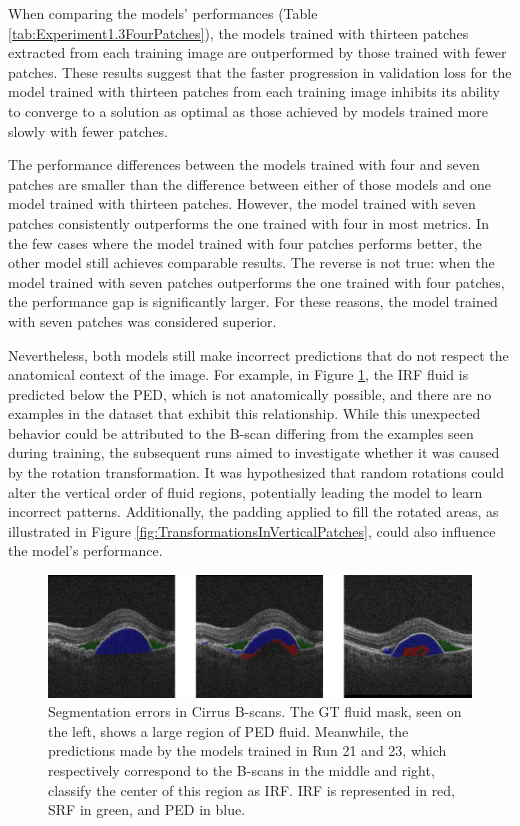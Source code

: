 When comparing the models' performances (Table \ref{tab:Experiment1.3FourPatches}), the models trained with thirteen patches extracted from each training image are outperformed by those trained with fewer patches. These results suggest that the faster progression in validation loss for the model trained with thirteen patches from each training image inhibits its ability to converge to a solution as optimal as those achieved by models trained more slowly with fewer patches.
\par
The performance differences between the models trained with four and seven patches are smaller than the difference between either of those models and one model trained with thirteen patches. However, the model trained with seven patches consistently outperforms the one trained with four in most metrics. In the few cases where the model trained with four patches performs better, the other model still achieves comparable results. The reverse is not true: when the model trained with seven patches outperforms the one trained with four patches, the performance gap is significantly larger. For these reasons, the model trained with seven patches was considered superior.
\par
Nevertheless, both models still make incorrect predictions that do not respect the anatomical context of the image. For example, in Figure \ref{fig:CirrusSegmentationErrors}, the IRF fluid is predicted below the PED, which is not anatomically possible, and there are no examples in the dataset that exhibit this relationship. While this unexpected behavior could be attributed to the B-scan differing from the examples seen during training, the subsequent runs aimed to investigate whether it was caused by the rotation transformation. It was hypothesized that random rotations could alter the vertical order of fluid regions, potentially leading the model to learn incorrect patterns. Additionally, the padding applied to fill the rotated areas, as illustrated in Figure \ref{fig:TransformationsInVerticalPatches}, could also influence the model's performance.

\begin{figure}[!ht]
	\centering
	\includegraphics[width=1.0\linewidth]{figures/CirrusSegmentationErrors.png}
	\caption{Segmentation errors in Cirrus B-scans. The GT fluid mask, seen on the left, shows a large region of PED fluid. Meanwhile, the predictions made by the models trained in Run 21 and 23, which respectively correspond to the B-scans in the middle and right, classify the center of this region as IRF. IRF is represented in red, SRF in green, and PED in blue.}
	\label{fig:CirrusSegmentationErrors}
\end{figure}

